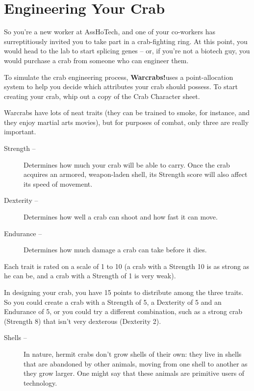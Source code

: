 \documentclass[a4paper,10pt]{article}
\newcommand{\warcrabs}{\textbf{Warcrabs!}}
\begin{document}
\section*{Engineering Your Crab}
\label{sec:EngineeringYourCrab}

So you're a new worker at AssHoTech, and one of your co-workers has surreptitiously invited you to take part in a crab-fighting ring. At this point, you would head to the lab to start splicing genes -- or, if you're not a biotech guy, you would purchase a crab from someone who can engineer them.

To simulate the crab engineering process, \warcrabs\hspace*{4pt}uses a point-allocation system to help you decide which attributes your crab should possess. To start creating your crab, whip out a copy of the Crab Character sheet.

Warcrabs have lots of neat traits (they can be trained to smoke, for instance, and they enjoy martial arts movies), but for purposes of combat, only three are really important.

\begin{description}
 \item[Strength --] Determines how much your crab will be able to carry. Once the crab acquires an armored, weapon-laden shell, its Strength score will also affect its speed of movement.

 \item[Dexterity --] Determines how well a crab can shoot and how fast it can move.

 \item[Endurance --] Determines how much damage a crab can take before it dies.
 \end{description}

Each trait is rated on a scale of 1 to 10 (a crab with a Strength 10 is as strong as he can be, and a crab with a Strength of 1 is very weak).

In designing your crab, you have 15 points to distribute among the three traits. So you could create a crab with a Strength of 5, a Dexterity of 5 and an Endurance of 5, or you could try a different combination, such as a strong crab (Strength 8) that isn't very dexterous (Dexterity 2).

\begin{description}
 \item[Shells --] In nature, hermit crabs don't grow shells of their own: they live in shells that are abandoned by other animals, moving from one shell to another as they grow larger. One might say that these animals are primitive users of technology.
 \end{description}
\end{document}
